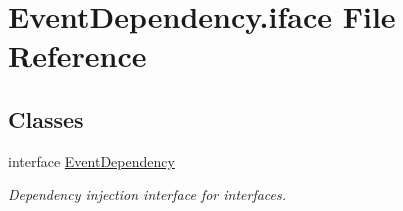 \hypertarget{EventDependency_8iface}{\section{Event\-Dependency.\-iface File Reference}
\label{EventDependency_8iface}
}
\subsection*{Classes}
\begin{DoxyCompactItemize}
\item 
interface \hyperlink{interfaceEventDependency}{Event\-Dependency}
\begin{DoxyCompactList}\small\item\em Dependency injection interface for interfaces. \end{DoxyCompactList}\end{DoxyCompactItemize}
